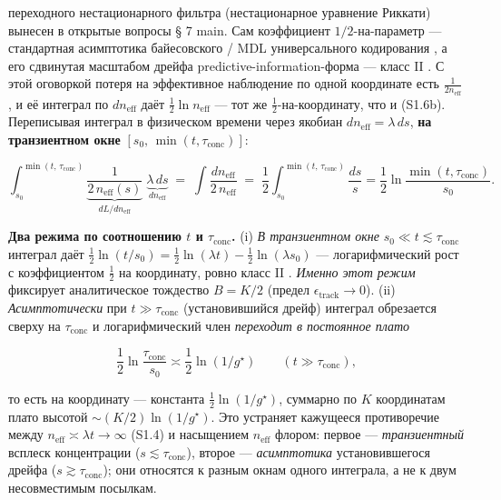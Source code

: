 \documentclass[12pt]{iopart}
\begin{document}
переходного нестационарного фильтра (нестационарное уравнение Риккати) вынесен в открытые вопросы § 7 main. Сам коэффициент \(1/2\)-на-параметр --- стандартная асимптотика байесовского / MDL универсального кодирования \cite{ClarkeBarron1990,Rissanen1986,Schwarz1978}, а его сдвинутая масштабом дрейфа predictive-information-форма --- класс II \cite{BialekNemenmanTishby2001}. С этой оговоркой потеря на эффективное наблюдение по одной координате есть \(\tfrac{1}{2n_{\text{eff}}}\), и её интеграл по \(dn_{\text{eff}}\) даёт \(\tfrac12\ln n_{\text{eff}}\) --- тот же \(\tfrac12\)-на-координату, что и (S1.6b). Переписывая интеграл в физическом времени через якобиан \(dn_{\text{eff}}=\lambda\,ds\), \textbf{на транзиентном окне} \([s_0,\,\min(t,\tau_{\text{conc}})]\):



\begin{equation}\int_{s_0}^{\min(t,\,\tau_{\text{conc}})} \underbrace{\frac{1}{2\,n_{\text{eff}}(s)}}_{dL/dn_{\text{eff}}}\;\underbrace{\lambda\,ds}_{dn_{\text{eff}}} \;=\; \int \frac{dn_{\text{eff}}}{2\,n_{\text{eff}}} \;=\; \frac12\int_{s_0}^{\min(t,\,\tau_{\text{conc}})}\frac{ds}{s} = \frac12\ln\frac{\min(t,\tau_{\text{conc}})}{s_0}. \tag{S1.8}\end{equation}



\textbf{Два режима по соотношению \(t\) и \(\tau_{\text{conc}}\).} (i) \emph{В транзиентном окне} \(s_0 \ll t \lesssim \tau_{\text{conc}}\) интеграл даёт \(\tfrac12\ln(t/s_0) = \tfrac12\ln(\lambda t) - \tfrac12\ln(\lambda s_0)\) --- логарифмический рост с коэффициентом \(\tfrac12\) на координату, ровно класс II \cite{BialekNemenmanTishby2001}. \emph{Именно этот режим} фиксирует аналитическое тождество \(B = K/2\) (предел \(\epsilon_{\text{track}}\to 0\)). (ii) \emph{Асимптотически} при \(t \gg \tau_{\text{conc}}\) (установившийся дрейф) интеграл обрезается сверху на \(\tau_{\text{conc}}\) и логарифмический член \emph{переходит в постоянное плато}



\begin{equation}\frac12\ln\frac{\tau_{\text{conc}}}{s_0} \asymp \frac12\ln(1/g^\star) \qquad (t \gg \tau_{\text{conc}}), \tag{S1.8a}\end{equation}



то есть на координату --- константа \(\tfrac12\ln(1/g^\star)\), суммарно по \(K\) координатам плато высотой \(\sim (K/2)\ln(1/g^\star)\). Это устраняет кажущееся противоречие между \(n_{\text{eff}}\asymp\lambda t\to\infty\) (S1.4) и насыщением \(n_{\text{eff}}\) флором: первое --- \emph{транзиентный} всплеск концентрации (\(s \lesssim \tau_{\text{conc}}\)), второе --- \emph{асимптотика} установившегося дрейфа (\(s \gtrsim \tau_{\text{conc}}\)); они относятся к разным окнам одного интеграла, а не к двум несовместимым посылкам.
\end{document}
